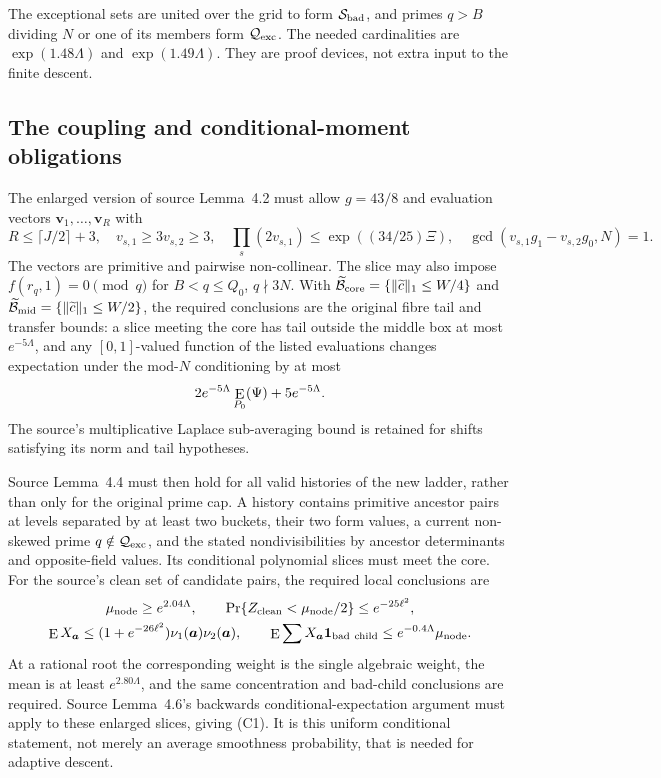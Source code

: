 The exceptional sets are united over the grid to form
$\mathcal S_{\rm bad}$, and primes $q>B$ dividing $N$ or one of
its members form $\mathcal Q_{\rm exc}$.  The needed cardinalities
are $\exp(1.48\Lambda)$ and $\exp(1.49\Lambda)$.
They are proof devices, not extra input to the finite descent.

\subsection{The coupling and conditional-moment obligations}

The enlarged version of source Lemma~4.2 must allow
$g=43/8$ and evaluation vectors
$\boldsymbol v_1,\ldots,\boldsymbol v_R$ with
\[
 R\le\lceil J/2\rceil+3,\quad
 v_{s,1}\ge3v_{s,2}\ge3,\quad
 \prod_s(2v_{s,1})\le\exp((34/25)\Xi),\quad
 \gcd(v_{s,1}g_1-v_{s,2}g_0,N)=1.
\]
The vectors are primitive and pairwise non-collinear.  The slice
may also impose $f(r_q,1)=0\pmod q$ for $B<q\le Q_0$,
$q\nmid3N$.  With
$\widetilde{\mathcal B}_{\rm core}
=\{\|\widetilde c\|_1\le W/4\}$ and
$\widetilde{\mathcal B}_{\rm mid}
=\{\|\widetilde c\|_1\le W/2\}$,
the required conclusions are the original fibre tail and transfer
bounds: a slice meeting the core has tail outside the middle box
at most $e^{-5\Lambda}$, and any $[0,1]$-valued function of the
listed evaluations changes expectation under the mod-$N$
conditioning by at most
\[
 2e^{-5\Lambda}\mathop{\rm E}_{P_0}(\Psi)+5e^{-5\Lambda}.
\]
The source's multiplicative Laplace sub-averaging bound is retained
for shifts satisfying its norm and tail hypotheses.

Source Lemma~4.4 must then hold for all valid histories of the new
ladder, rather than only for the original prime cap.  A history
contains primitive ancestor pairs at levels separated by at least
two buckets, their two form values, a current non-skewed prime
$q\notin\mathcal Q_{\rm exc}$, and the stated nondivisibilities by
ancestor determinants and opposite-field values.  Its conditional
polynomial slices must meet the core.  For the source's clean set
of candidate pairs, the required local conclusions are
\begin{gather*}
 \mu_{\rm node}\ge e^{2.04\Lambda},\qquad
 \mathop{\rm Pr}\{Z_{\rm clean}<\mu_{\rm node}/2\}\le e^{-25\ell^2},\\
 \mathop{\rm E} X_{\boldsymbol a}\le
 (1+e^{-26\ell^2})\nu_1(\boldsymbol a)\nu_2(\boldsymbol a),\qquad
 \mathop{\rm E}\sum X_{\boldsymbol a}\boldsymbol1_{\rm bad\ child}
       \le e^{-0.4\Lambda}\mu_{\rm node}.
\end{gather*}
At a rational root the corresponding weight is the single
algebraic weight, the mean is at least $e^{2.80\Lambda}$, and the
same concentration and bad-child conclusions are required.
Source Lemma~4.6's backwards conditional-expectation argument must
apply to these enlarged slices, giving \textup{(C1)}.  It is this
uniform conditional statement, not merely an average smoothness
probability, that is needed for adaptive descent.

